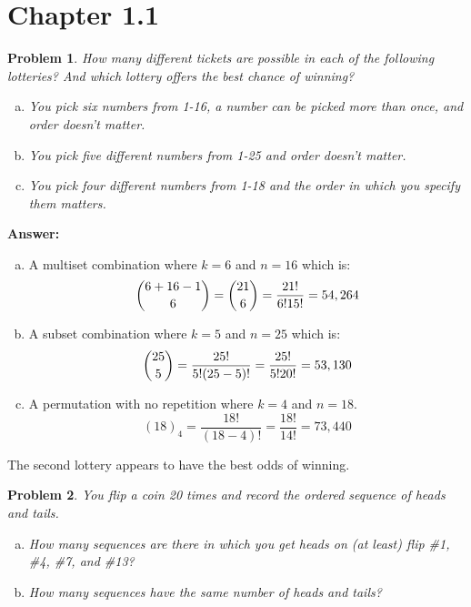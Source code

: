 \documentclass{article}
\theoremstyle{plain}
\newtheorem{problem}{Problem}
\begin{document}
\section{Chapter 1.1}

\begin{problem} %
How many different tickets are possible in each of the following lotteries? And which lottery offers the best chance of winning?
\begin{enumerate}[(a)]
    \item You pick six numbers from 1-16, a number can be picked more than once, and order doesn't matter.
    \item You pick five different numbers from 1-25 and order doesn't matter.
    \item You pick four different numbers from 1-18 and the order in which you specify them matters.
\end{enumerate}
\end{problem}

\textbf{Answer:}
\begin{enumerate}[(a)]
    \item A multiset combination where $k = 6$ and $n=16$ which is:
    \begin{equation*}
        \dbinom{6+16-1}{6} = \dbinom{21}{6} = \dfrac{21!}{6!15!} = 54,264
    \end{equation*}
    \item A subset combination where $k = 5$ and $n=25$ which is:
    \begin{equation*}
        \dbinom{25}{5} = \dfrac{25!}{5!(25-5)!} = \dfrac{25!}{5!20!} = 53,130
    \end{equation*}
    \item A permutation with no repetition where $k = 4$ and $n=18$.
    \begin{equation*}
        (18)_{4} = \dfrac{18!}{(18-4)!} = \dfrac{18!}{14!} = 73,440
    \end{equation*}
\end{enumerate}
The second lottery appears to have the best odds of winning.

\begin{problem} %

You flip a coin 20 times and record the ordered sequence of heads and tails.

\begin{enumerate}[(a)]
\item How many sequences are there in which you get heads on (at least) flip \#1, \#4, \#7, and \#13?

\item How many sequences have the same number of heads and tails?
\end{enumerate}
\end{problem}
\end{document}
